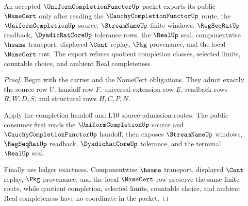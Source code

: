 \begin{theorem}
\label{thm:uniform-completion-functor-public-namecert-export}
An accepted $\UniformCompletionFunctorUp$ packet exports its public $\NameCert$ only after reading the $\CauchyCompletionFunctorUp$ route, the $\UniformCompletionUp$ source, $\StreamNameUp$ finite windows, $\RegSeqRatUp$ readback, $\DyadicRatCoreUp$ tolerance rows, the $\RealUp$ seal, componentwise $\hsame$ transport, displayed $\Cont$ replay, $\Pkg$ provenance, and the local $\NameCert$ row. The export refuses quotient completion classes, selected limits, countable choice, and ambient Real completeness.
\end{theorem}
\begin{proof}
Begin with the carrier and the NameCert obligations. They admit exactly the source row $U$, handoff row $F$, universal-extension row $E$, readback rows $R,W,D,S$, and structural rows $H,C,P,N$.

Apply the completion handoff and L10 source-admission routes. The public consumer first reads the $\UniformCompletionUp$ source and $\CauchyCompletionFunctorUp$ handoff, then exposes $\StreamNameUp$ windows, $\RegSeqRatUp$ readback, $\DyadicRatCoreUp$ tolerance, and the terminal $\RealUp$ seal.

Finally use ledger exactness. Componentwise $\hsame$ transport, displayed $\Cont$ replay, $\Pkg$ provenance, and the local $\NameCert$ row preserve the same finite route, while quotient completion, selected limits, countable choice, and ambient Real completeness have no coordinate in the packet.
\end{proof}

